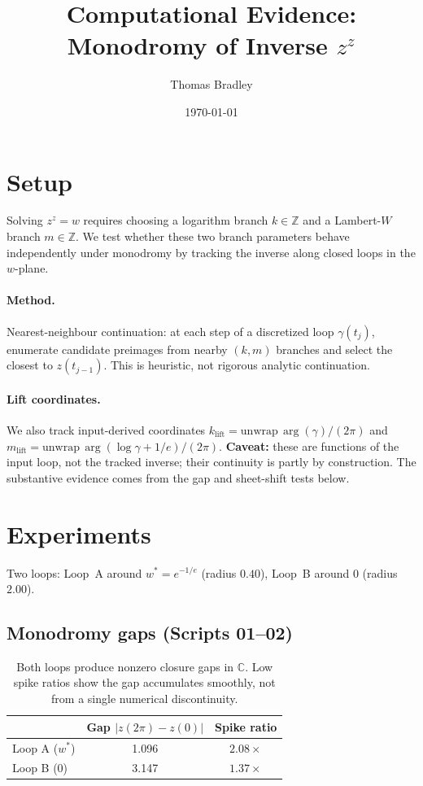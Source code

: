 \documentclass[11pt]{article}
\title{Computational Evidence: Monodromy of Inverse $z^z$}
\author{Thomas Bradley}
\date{\today}
\begin{document}
\maketitle

\section{Setup}

Solving $z^z = w$ requires choosing a logarithm branch $k\in\mathbb{Z}$
and a Lambert-$W$ branch $m\in\mathbb{Z}$. We test whether these two
branch parameters behave independently under monodromy by tracking the
inverse along closed loops in the $w$-plane.

\paragraph{Method.}
Nearest-neighbour continuation: at each step of a discretized loop
$\gamma(t_j)$, enumerate candidate preimages from nearby $(k,m)$ branches
and select the closest to $z(t_{j-1})$. This is heuristic, not rigorous
analytic continuation.

\paragraph{Lift coordinates.}
We also track input-derived coordinates
$k_{\mathrm{lift}} = \mathrm{unwrap}\,\arg(\gamma)/(2\pi)$ and
$m_{\mathrm{lift}} = \mathrm{unwrap}\,\arg(\log\gamma + 1/e)/(2\pi)$.
\textbf{Caveat:} these are functions of the input loop, not the tracked
inverse; their continuity is partly by construction. The substantive
evidence comes from the gap and sheet-shift tests below.

\section{Experiments}

Two loops: Loop~A around $w^\ast = e^{-1/e}$ (radius $0.40$),
Loop~B around $0$ (radius $2.00$).

\subsection{Monodromy gaps (Scripts 01--02)}

\begin{table}[h]
\centering
\begin{tabular}{lcc}
\toprule
 & Gap $|z(2\pi)-z(0)|$ & Spike ratio \\
\midrule
Loop A ($w^\ast$) & 1.096 & $2.08\times$ \\
Loop B ($0$)      & 3.147 & $1.37\times$ \\
\bottomrule
\end{tabular}
\caption{Both loops produce nonzero closure gaps in $\mathbb{C}$.
  Low spike ratios show the gap accumulates smoothly, not from a
  single numerical discontinuity.}
\end{table}
\end{document}
